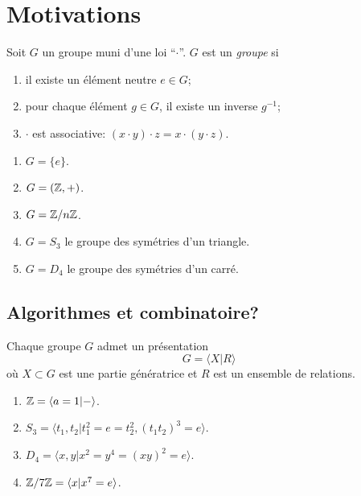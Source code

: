 
\chapter{Motivations}

  \begin{defi}
    Soit $G$ un groupe muni d'une loi ``$\cdot$''. $G$ est un \emph{groupe} si 
    \begin{enumerate}
    \item il existe un élément neutre $e \in G$;
    \item pour chaque élément $g \in G$, il existe un inverse $g^{-1}$;
    \item $\cdot$ est associative: $(x\cdot y)\cdot z = x \cdot (y \cdot z)$.
    \end{enumerate}
  \end{defi}

  \begin{exs}
    \begin{enumerate}
    \item $G = \{e\}$.
    \item $G = (\mathbb{Z}, +)$.
    \item $G = \mathbb{Z}/n\mathbb{Z}$.
    \item $G = S_3$ le groupe des symétries d'un triangle.
    \item $G = D_4$ le groupe des symétries d'un carré.
    \end{enumerate}
  \end{exs}

  \section{Algorithmes et combinatoire?}

    Chaque groupe $G$ admet un présentation 
      \[G = \langle X | R \rangle \]
    où $X \subset G$ est une partie génératrice et $R$ est un ensemble de relations.

    \begin{exs}
      \begin{enumerate}
      \item $\mathbb{Z} = \langle a = 1 | - \rangle$.
      \item $S_3 = \langle t_1, t_2 | t_1^2 = e = t_2^2, (t_1t_2)^3 = e\rangle$.
      \item $D_4 = \langle x, y | x^2 = y^4 = (xy)^2 = e \rangle$.
      \item $\mathbb{Z}/7\mathbb{Z} = \langle x | x^7 = e\rangle$.
      \end{enumerate}
    \end{exs}
    
